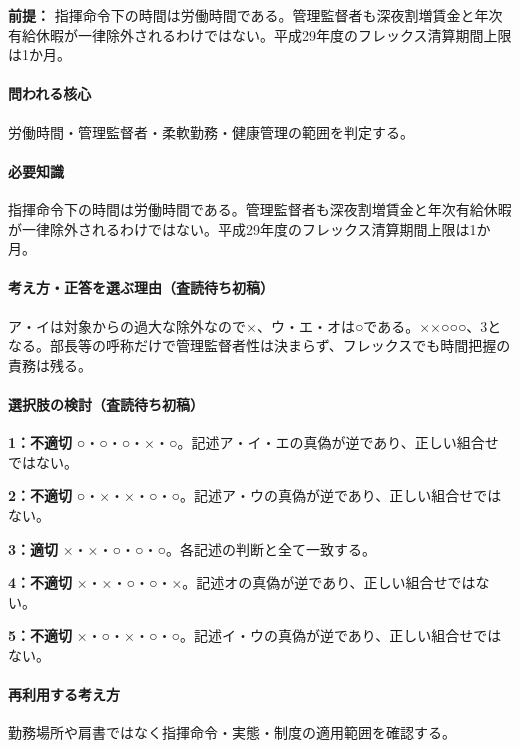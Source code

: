 \noindent\textbf{前提：} 指揮命令下の時間は労働時間である。管理監督者も深夜割増賃金と年次有給休暇が一律除外されるわけではない。平成29年度のフレックス清算期間上限は1か月。\par

\paragraph{問われる核心} 労働時間・管理監督者・柔軟勤務・健康管理の範囲を判定する。

\paragraph{必要知識} 指揮命令下の時間は労働時間である。管理監督者も深夜割増賃金と年次有給休暇が一律除外されるわけではない。平成29年度のフレックス清算期間上限は1か月。

\paragraph{考え方・正答を選ぶ理由（査読待ち初稿）} ア・イは対象からの過大な除外なので×、ウ・エ・オは○である。××○○○、3となる。部長等の呼称だけで管理監督者性は決まらず、フレックスでも時間把握の責務は残る。

\paragraph{選択肢の検討（査読待ち初稿）}\mbox{}\par

\noindent\textbf{1：不適切} ○・○・○・×・○。記述ア・イ・エの真偽が逆であり、正しい組合せではない。\par

\noindent\textbf{2：不適切} ○・×・×・○・○。記述ア・ウの真偽が逆であり、正しい組合せではない。\par

\noindent\textbf{3：適切} ×・×・○・○・○。各記述の判断と全て一致する。\par

\noindent\textbf{4：不適切} ×・×・○・○・×。記述オの真偽が逆であり、正しい組合せではない。\par

\noindent\textbf{5：不適切} ×・○・×・○・○。記述イ・ウの真偽が逆であり、正しい組合せではない。\par

\paragraph{再利用する考え方} 勤務場所や肩書ではなく指揮命令・実態・制度の適用範囲を確認する。

